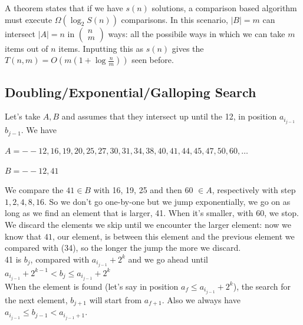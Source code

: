 \documentclass[10pt]{report}
\begin{document}
A theorem states that if we have $s(n)$ solutions, a comparison based algorithm must execute $\Omega(\log_2 S(n))$ comparisons. In this scenario, $|B| = m$ can intersect $|A| = n$ in $\left(\begin{array}{c}
n\\m
\end{array}\right)$ ways: all the possibile ways in which we can take $m$ items out of $n$ items. Inputting this as $s(n)$ gives the $T(n, m) = O(m(1 + \log\frac{n}{m}))$ seen before.
\subsection{Doubling/Exponential/Galloping Search} Let's take $A, B$ and assumes that they intersect up until the 12, in position $a_{i_{j-1}}$ $b_{j-1}$. We have
\begin{list}{}{}
	\item $A = -- 12, 16, 19, 20, 25, 27, 30, 31, 34, 38, 40, 41, 44, 45, 47, 50, 60,\ldots$
	\item $B = -- 12, 41$
\end{list}
We compare the $41\in B$ with 16, 19, 25 and then 60 $\in A$, respectively with step $1, 2, 4, 8, 16$. So we don't go one-by-one but we jump exponentially, we go on as long as we find an element that is larger, 41. When it's smaller, with 60, we stop. We discard the elements we skip until we encounter the larger element: now we know that $41$, our element, is between this element and the previous element we compared with (34), so the longer the jump the more we discard.\\
41 is $b_j$, compared with $a_{i_{j-1}} + 2^k$ and we go ahead until $a_{i_{j-1}} + 2^{k-1} < b_j \leq a_{i_{j-1}} + 2^k$\\
When the element is found (let's say in position $a_f \leq a_{i_{j-1}} + 2^k$), the search for the next element, $b_{j+1}$ will start from $a_{f+1}$. Also we always have $a_{i_{j-1}} \leq b_{j-1} < a_{i_{j-1} +1}$.
\end{document}
